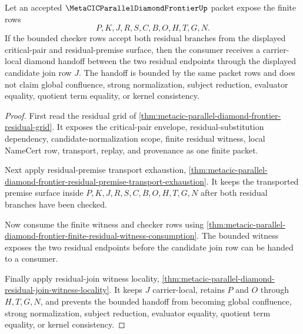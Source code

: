 \begin{theorem}
\label{thm:metacic-parallel-diamond-frontier-residual-local-confluence}
Let an accepted $\MetaCICParallelDiamondFrontierUp$ packet expose the finite rows
$$
P,K,J,R,S,C,B,O,H,T,G,N .
$$
If the bounded checker rows accept both residual branches from the displayed critical-pair and residual-premise surface, then the consumer receives a carrier-local diamond handoff between the two residual endpoints through the displayed candidate join row $J$. The handoff is bounded by the same packet rows and does not claim global confluence, strong normalization, subject reduction, evaluator equality, quotient term equality, or kernel consistency.
\end{theorem}
\begin{proof}
First read the residual grid of \autoref{thm:metacic-parallel-diamond-frontier-residual-grid}. It exposes the critical-pair envelope, residual-substitution dependency, candidate-normalization scope, finite residual witness, local NameCert row, transport, replay, and provenance as one finite packet.

Next apply residual-premise transport exhaustion, \autoref{thm:metacic-parallel-diamond-frontier-residual-premise-transport-exhaustion}. It keeps the transported premise surface inside $P,K,J,R,S,C,B,O,H,T,G,N$ after both residual branches have been checked.

Now consume the finite witness and checker rows using \autoref{thm:metacic-parallel-diamond-frontier-finite-residual-witness-consumption}. The bounded witness exposes the two residual endpoints before the candidate join row can be handed to a consumer.

Finally apply residual-join witness locality, \autoref{thm:metacic-parallel-diamond-residual-join-witness-locality}. It keeps $J$ carrier-local, retains $P$ and $O$ through $H,T,G,N$, and prevents the bounded handoff from becoming global confluence, strong normalization, subject reduction, evaluator equality, quotient term equality, or kernel consistency.
\end{proof}

